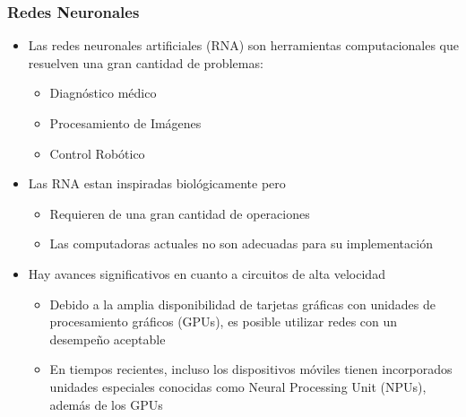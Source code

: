\frame
{
\frametitle{Redes Neuronales}
\begin{itemize}  
	\item Las redes neuronales artificiales (RNA) son herramientas computacionales que resuelven una gran cantidad de problemas: 
		\begin{itemize}
			\item Diagnóstico médico %
			\item Procesamiento de Im\'agenes %
			\item Control Robótico %
		\end{itemize}
	\item Las RNA estan inspiradas biológicamente pero  %
		\begin{itemize}
		\item Requieren de una gran cantidad de operaciones  %
		\item Las computadoras actuales no son adecuadas para su implementación %
		\end{itemize}
	\item Hay avances significativos en cuanto a circuitos de alta velocidad %
		\begin{itemize}
		\item Debido a la amplia disponibilidad de tarjetas gráficas con unidades de procesamiento gráficos (GPUs), es posible utilizar redes con un desempeño aceptable
		\item En tiempos recientes, incluso los dispositivos móviles tienen incorporados unidades especiales conocidas como Neural Processing Unit (NPUs), además de los GPUs
		\end{itemize}
\end{itemize}
}

